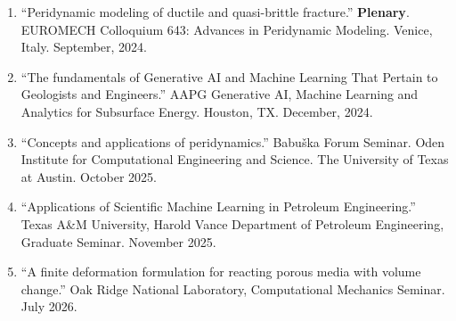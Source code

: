 \begin{enumerate}[resume]
    \item ``Peridynamic modeling of ductile and quasi-brittle fracture.'' {\bf Plenary}. EUROMECH Colloquium 643: Advances in Peridynamic Modeling. Venice, Italy.  September, 2024.
    \item ``The fundamentals of Generative AI and Machine Learning That Pertain to Geologists and Engineers.''  AAPG Generative AI, Machine Learning and Analytics for Subsurface Energy. Houston, TX.  December, 2024.
    \item ``Concepts and applications of peridynamics.'' Babu\v{s}ka Forum Seminar. Oden Institute for Computational Engineering and Science. The University of Texas at Austin. October 2025.
    \item ``Applications of Scientific Machine Learning in Petroleum Engineering.'' Texas A\&M University, Harold Vance Department of Petroleum Engineering, Graduate Seminar. November 2025.
    \item ``A finite deformation formulation for reacting porous media with volume change.'' Oak Ridge National Laboratory, Computational Mechanics Seminar. July 2026.
\end{enumerate}
\else
%
\ifdefined\ispdf
